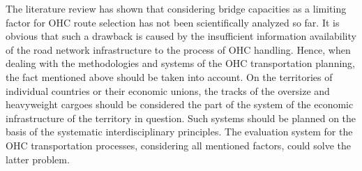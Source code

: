 The literature review has shown that considering bridge capacities as a limiting factor for OHC route selection has not been scientifically analyzed so far. It is obvious that such a drawback is caused by the insufficient information availability of the road network infrastructure to the process of OHC handling. Hence, when dealing with the methodologies and systems of the OHC transportation planning, the fact mentioned above should be taken into account. On the territories of individual countries or their economic unions, the tracks of the oversize and heavyweight cargoes should be considered the part of the system of the economic infrastructure of the territory in question. Such systems should be planned on the basis of the systematic interdisciplinary principles. The evaluation system for the OHC transportation processes, considering all mentioned factors, could solve the latter problem. 
